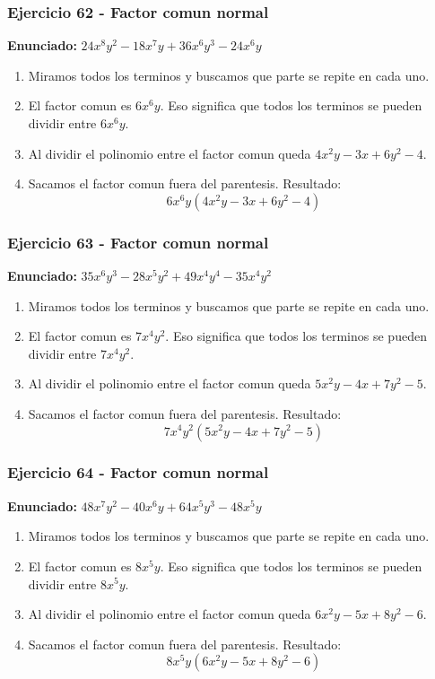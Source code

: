 \documentclass[11pt,a4paper]{article}
\begin{document}
\subsubsection*{Ejercicio 62 - Factor comun normal}
\textbf{Enunciado:} $ 24 x^{8} y^{2} - 18 x^{7} y + 36 x^{6} y^{3} - 24 x^{6} y $\par
\begin{enumerate}[leftmargin=2em]
\item Miramos todos los terminos y buscamos que parte se repite en cada uno.
\item El factor comun es \(6 x^{6} y\). Eso significa que todos los terminos se pueden dividir entre \(6 x^{6} y\).
\item Al dividir el polinomio entre el factor comun queda \(4 x^{2} y - 3 x + 6 y^{2} - 4\).
\item Sacamos el factor comun fuera del parentesis. Resultado: \[\boxed{6 x^{6} y\left(4 x^{2} y - 3 x + 6 y^{2} - 4\right)}\]
\end{enumerate}

\vspace{0.2cm}
\subsubsection*{Ejercicio 63 - Factor comun normal}
\textbf{Enunciado:} $ 35 x^{6} y^{3} - 28 x^{5} y^{2} + 49 x^{4} y^{4} - 35 x^{4} y^{2} $\par
\begin{enumerate}[leftmargin=2em]
\item Miramos todos los terminos y buscamos que parte se repite en cada uno.
\item El factor comun es \(7 x^{4} y^{2}\). Eso significa que todos los terminos se pueden dividir entre \(7 x^{4} y^{2}\).
\item Al dividir el polinomio entre el factor comun queda \(5 x^{2} y - 4 x + 7 y^{2} - 5\).
\item Sacamos el factor comun fuera del parentesis. Resultado: \[\boxed{7 x^{4} y^{2}\left(5 x^{2} y - 4 x + 7 y^{2} - 5\right)}\]
\end{enumerate}

\vspace{0.2cm}
\subsubsection*{Ejercicio 64 - Factor comun normal}
\textbf{Enunciado:} $ 48 x^{7} y^{2} - 40 x^{6} y + 64 x^{5} y^{3} - 48 x^{5} y $\par
\begin{enumerate}[leftmargin=2em]
\item Miramos todos los terminos y buscamos que parte se repite en cada uno.
\item El factor comun es \(8 x^{5} y\). Eso significa que todos los terminos se pueden dividir entre \(8 x^{5} y\).
\item Al dividir el polinomio entre el factor comun queda \(6 x^{2} y - 5 x + 8 y^{2} - 6\).
\item Sacamos el factor comun fuera del parentesis. Resultado: \[\boxed{8 x^{5} y\left(6 x^{2} y - 5 x + 8 y^{2} - 6\right)}\]
\end{enumerate}
\end{document}
